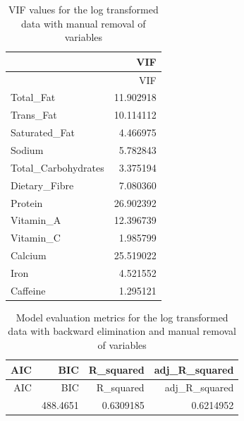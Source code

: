 \documentclass[
]{article}
\newenvironment{Shaded}{\begin{snugshade}}{\end{snugshade}}
\newcommand{\AttributeTok}[1]{\textcolor[rgb]{0.13,0.29,0.53}{#1}}
\newcommand{\FunctionTok}[1]{\textcolor[rgb]{0.13,0.29,0.53}{\textbf{#1}}}
\newcommand{\NormalTok}[1]{#1}
\newcommand{\SpecialCharTok}[1]{\textcolor[rgb]{0.81,0.36,0.00}{\textbf{#1}}}
\newcommand{\StringTok}[1]{\textcolor[rgb]{0.31,0.60,0.02}{#1}}
\begin{document}
\begin{longtable}[]{@{}lr@{}}
\caption{VIF values for the log transformed data with manual removal of
variables}\tabularnewline
\toprule\noalign{}
& VIF \\
\midrule\noalign{}
\endfirsthead
\toprule\noalign{}
& VIF \\
\midrule\noalign{}
\endhead
\bottomrule\noalign{}
\endlastfoot
Total\_Fat & 11.902918 \\
Trans\_Fat & 10.114112 \\
Saturated\_Fat & 4.466975 \\
Sodium & 5.782843 \\
Total\_Carbohydrates & 3.375194 \\
Dietary\_Fibre & 7.080360 \\
Protein & 26.902392 \\
Vitamin\_A & 12.396739 \\
Vitamin\_C & 1.985799 \\
Calcium & 25.519022 \\
Iron & 4.521552 \\
Caffeine & 1.295121 \\
\end{longtable}

\begin{Shaded}
\end{Shaded}

\begin{longtable}[]{@{}rrrr@{}}
\caption{Model evaluation metrics for the log transformed data with
backward elimination and manual removal of variables}\tabularnewline
\toprule\noalign{}
AIC & BIC & R\_squared & adj\_R\_squared \\
\midrule\noalign{}
\endfirsthead
\toprule\noalign{}
AIC & BIC & R\_squared & adj\_R\_squared \\
\midrule\noalign{}
\endhead
\bottomrule\noalign{}
\endlastfoot
460.5536 & 488.4651 & 0.6309185 & 0.6214952 \\
\end{longtable}
\end{document}
